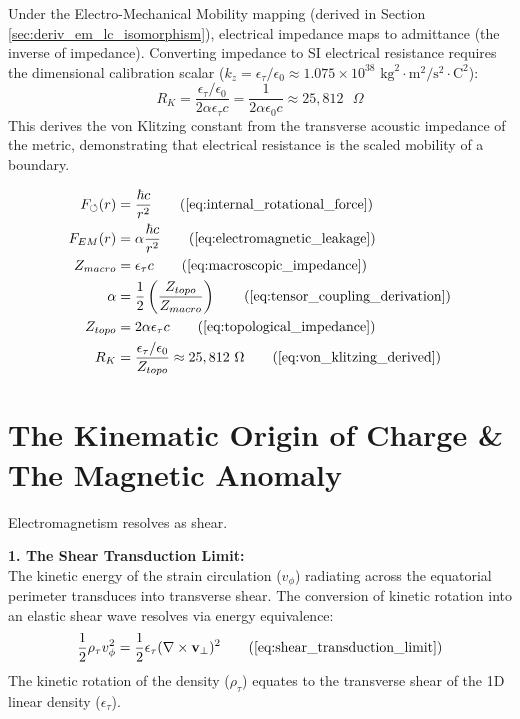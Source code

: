 Under the Electro-Mechanical Mobility mapping (derived in Section \ref{sec:deriv_em_lc_isomorphism}), electrical impedance maps to admittance (the inverse of impedance). Converting impedance to SI electrical resistance requires the dimensional calibration scalar ($k_z = \epsilon_\tau / \epsilon_0 \approx 1.075 \times 10^{38} \text{ kg}^2\cdot\text{m}^2/\text{s}^2\cdot\text{C}^2$):
\begin{equation}
    R_K  = \frac{\epsilon_\tau / \epsilon_0}{2\alpha \epsilon_\tau c} = \frac{1}{2\alpha \epsilon_0 c} \approx 25,812 \text{ } \Omega \label{eq:von_klitzing_derived}
\end{equation}
This derives the von Klitzing constant from the transverse acoustic impedance of the metric, demonstrating that electrical resistance is the scaled mobility of a boundary.

\begin{tcolorbox}[recallbox, title={\ref{box:fine_structure2}. The Viscoelastic Modulus Ratio ($\alpha$) \& Topological Impedance}]
\begin{align}
    F_{\circlearrowleft}(r) &= \frac{\hbar c}{r^2} \tag{\ref{eq:internal_rotational_force}} \\
    F_{EM}(r) &= \alpha \frac{\hbar c}{r^2} \tag{\ref{eq:electromagnetic_leakage}} \\
    Z_{macro} &= \epsilon_{\tau} c \tag{\ref{eq:macroscopic_impedance}} \\
    \alpha &= \frac{1}{2} \left( \frac{Z_{topo}}{Z_{macro}} \right) \tag{\ref{eq:tensor_coupling_derivation}} \\
    Z_{topo} &= 2 \alpha \epsilon_{\tau} c \tag{\ref{eq:topological_impedance}} \\
    R_K &= \frac{\epsilon_\tau / \epsilon_0}{Z_{topo}} \approx 25,812 \text{ } \Omega \tag{\ref{eq:von_klitzing_derived}}
\end{align}
\end{tcolorbox}

\section{The Kinematic Origin of Charge \& The Magnetic Anomaly}
\label{sec:deriv_kinematic_charge}

Electromagnetism resolves as shear.

\textbf{1. The Shear Transduction Limit:} \\
The kinetic energy of the strain circulation ($v_\phi$) radiating across the equatorial perimeter transduces into transverse shear. The conversion of kinetic rotation into an elastic shear wave resolves via energy equivalence:
\begin{equation}
    \frac{1}{2}\rho_{\tau} v_\phi^2 = \frac{1}{2}\epsilon_{\tau} (\nabla \times \mathbf{v}_{\perp})^2 \tag{\ref{eq:shear_transduction_limit}}
\end{equation}
The kinetic rotation of the density ($\rho_{\tau}$) equates to the transverse shear of the 1D linear density ($\epsilon_{\tau}$).

